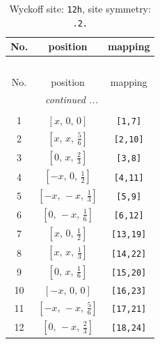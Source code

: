 \documentclass[fleqn,8pt]{jsarticle}
\begin{document}
\begin{longtable}{ccc}
\caption{Wyckoff site: {\tt 12h}, site symmetry: {\tt .2.}}
 \\
 \hline \hline
No. & position & mapping \\ \hline \endfirsthead

\multicolumn{2}{l}{\tablename\ \thetable{}} \\
 \hline \hline
No. & position & mapping \\ \hline \endhead

 \hline \hline
\multicolumn{2}{r}{\footnotesize\it continued ...} \\ \endfoot

 \hline \hline
\multicolumn{2}{r}{} \\ \endlastfoot

1 & $\left[ x,\, 0,\, 0 \right]$ & {\tt [1,7]} \\ \hline
2 & $\left[ x,\, x,\, \frac{5}{6} \right]$ & {\tt [2,10]} \\ \hline
3 & $\left[ 0,\, x,\, \frac{2}{3} \right]$ & {\tt [3,8]} \\ \hline
4 & $\left[ - x,\, 0,\, \frac{1}{2} \right]$ & {\tt [4,11]} \\ \hline
5 & $\left[ - x,\, - x,\, \frac{1}{3} \right]$ & {\tt [5,9]} \\ \hline
6 & $\left[ 0,\, - x,\, \frac{1}{6} \right]$ & {\tt [6,12]} \\ \hline
7 & $\left[ x,\, 0,\, \frac{1}{2} \right]$ & {\tt [13,19]} \\ \hline
8 & $\left[ x,\, x,\, \frac{1}{3} \right]$ & {\tt [14,22]} \\ \hline
9 & $\left[ 0,\, x,\, \frac{1}{6} \right]$ & {\tt [15,20]} \\ \hline
10 & $\left[ - x,\, 0,\, 0 \right]$ & {\tt [16,23]} \\ \hline
11 & $\left[ - x,\, - x,\, \frac{5}{6} \right]$ & {\tt [17,21]} \\ \hline
12 & $\left[ 0,\, - x,\, \frac{2}{3} \right]$ & {\tt [18,24]} \\
\end{longtable}
\renewcommand{\arraystretch}{1.2}
\end{document}
